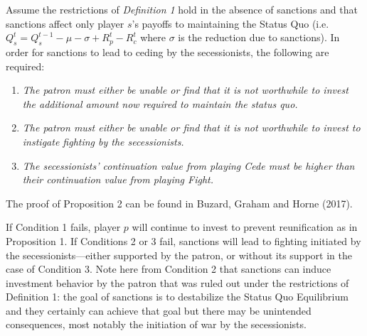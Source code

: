 \begin{proposition}
Assume the restrictions of \emph{Definition 1} hold in the absence of sanctions and that sanctions affect only player $s$'s payoffs to maintaining the Status Quo (i.e. $Q_s^t = Q_s^{t-1} - \mu -\sigma +R_p^t - R_c^t$ where $\sigma$ is the reduction due to sanctions).  In order for sanctions to lead to ceding by the secessionists, the following are required:

\begin{enumerate}
\item \textit{The patron must either be unable or find that it is not worthwhile to invest the additional amount now required to maintain the status quo.}

\item \textit{The patron must either be unable or find that it is not worthwhile to invest to instigate fighting by the secessionists.}



\item \textit{The secessionists' continuation value from playing Cede must be higher than their continuation value from playing Fight.}
\end{enumerate}

\end{proposition}

The proof of Proposition 2 can be found in Buzard, Graham and Horne (2017).

If Condition 1 fails, player $p$ will continue to invest to prevent reunification as in Proposition 1. If Conditions 2 or 3 fail, sanctions will lead to fighting initiated by the secessionists---either supported by the patron, or without its support in the case of Condition 3. Note here from Condition 2 that sanctions can induce investment behavior by the patron that was ruled out under the restrictions of Definition 1: the goal of sanctions is to destabilize the Status Quo Equilibrium and they certainly can achieve that goal but there may be unintended consequences, most notably the initiation of war by the secessionists. 

